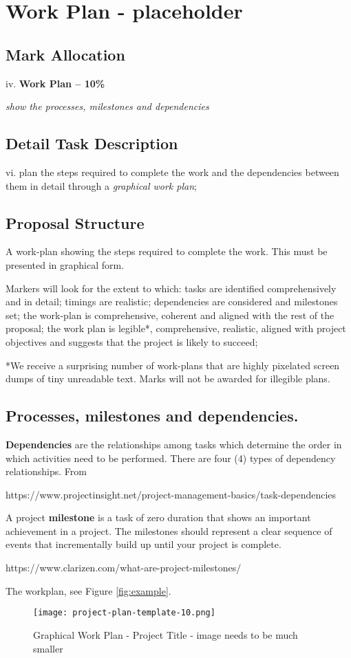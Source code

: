 \section{Work Plan - placeholder}
\subsection{Mark Allocation}

iv. \textbf{Work Plan -- 10\%}

\textit{show the processes, milestones and dependencies}

\subsection{Detail Task Description} 

vi. plan the steps required to complete the work and the dependencies between them in detail through a \textit{graphical work plan};

\subsection{Proposal Structure}

A work-plan showing the steps required to complete the work. This must be presented in graphical form.

Markers will look for the extent to which: tasks are identified comprehensively and in detail; timings are realistic; dependencies are considered and milestones set; the work-plan is comprehensive, coherent and aligned with the rest of the proposal; the work plan is legible*, comprehensive, realistic, aligned with project objectives and suggests that the project is likely to succeed;

*We receive a surprising number of work-plans that are highly pixelated screen dumps of tiny unreadable text. Marks will not be awarded for illegible plans.

\subsection{Processes, milestones and dependencies.}

\textbf{Dependencies} are the relationships among tasks which determine the order in which activities need to be performed. There are four (4) types of dependency relationships. From  

https://www.projectinsight.net/project-management-basics/task-dependencies

A project \textbf{milestone} is a task of zero duration that shows an important achievement in a project. The milestones should represent a clear sequence of events that incrementally build up until your project is complete.

https://www.clarizen.com/what-are-project-milestones/

The workplan, see Figure \ref{fig:example}. 

\begin{figure}[ht]
\centering\texttt{[image: project-plan-template-10.png]}
\caption{Graphical Work Plan - Project Title - image needs to be much smaller}
\label{fig:workplan}
\end{figure}